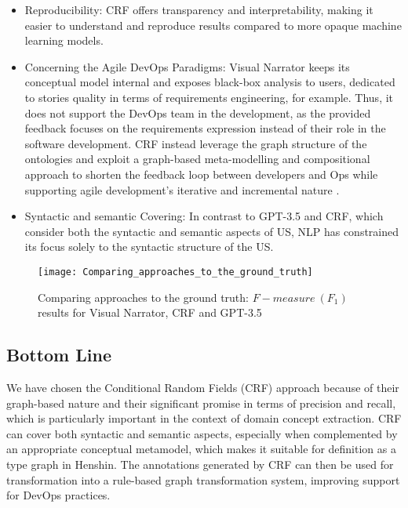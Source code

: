 \begin{itemize}
\item Reproducibility: CRF offers transparency and interpretability, making it easier to understand and reproduce results compared to more opaque machine learning models.
\item Concerning the Agile DevOps Paradigms: Visual Narrator keeps its conceptual model internal and exposes black-box analysis to users, dedicated to stories quality in terms of requirements engineering, for example. Thus, it does not support the DevOps team in the development, as the provided feedback focuses on the requirements expression instead of their role in the software development. CRF instead leverage the graph structure of the ontologies and exploit a graph-based meta-modelling and compositional approach to shorten the feedback loop between developers and Ops while supporting agile development’s iterative and incremental nature \cite{mosser2022modelling}.
\item Syntactic and semantic Covering: In contrast to GPT-3.5 and CRF, which consider both the syntactic and semantic aspects of US, NLP has constrained its focus solely to the syntactic structure of the US.
\end{itemize}
\begin{figure}
\center
\texttt{[image: Comparing\_approaches\_to\_the\_ground\_truth]}
\caption{Comparing approaches to the ground truth: $F-measure \ (F_1)$ results for Visual Narrator, CRF and GPT-3.5  \cite{arulmohan2023extracting}}\label{fig:coparing_approaches}
\end{figure}
\subsection{Bottom Line}\label{crf_bottom_line}
We have chosen the Conditional Random Fields (CRF) approach because of their graph-based nature and their significant promise in terms of precision and recall, which is particularly important in the context of domain concept extraction. CRF can cover both syntactic and semantic aspects, especially when complemented by an appropriate conceptual metamodel, which makes it suitable for definition as a type graph in Henshin. The annotations generated by CRF can then be used for transformation into a rule-based graph transformation system, improving support for DevOps practices.


